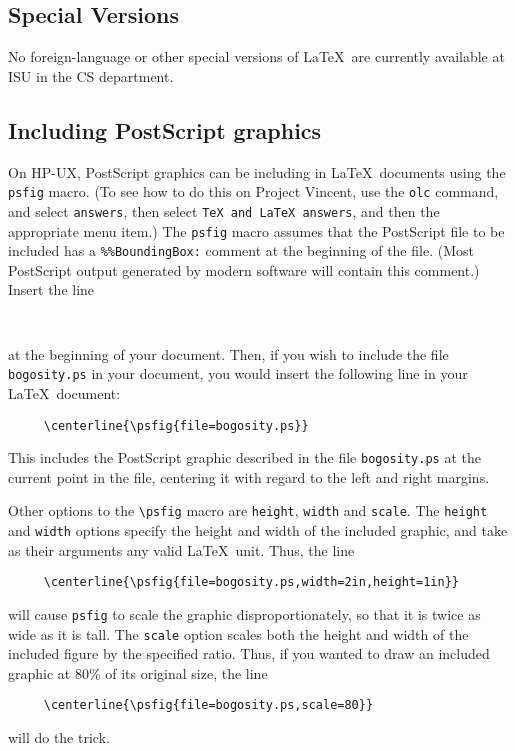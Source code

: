 \documentclass{article}
\begin{document}
\subsection{Special Versions}

No foreign-language or other special versions of \LaTeX\
are currently available at ISU in the CS department.


\subsection{Including PostScript graphics}

On HP-UX,
PostScript graphics can be including in \LaTeX\ documents using the 
{\tt psfig} macro.
(To see how to do this on Project Vincent, use the {\tt olc}
command, and select {\tt answers}, then select {\tt TeX and LaTeX answers},
and then the appropriate menu item.)
The {\tt psfig} macro assumes that the PostScript file to be included has a
\verb|%%BoundingBox:| comment at the beginning of the file.
(Most PostScript output generated by modern software will contain this 
comment.)
Insert the line
\begin{verbatim}
     
\end{verbatim}
at the beginning of your document.
Then, if you wish to include the file {\tt bogosity.ps}
in your document, you would
insert the following line in your \LaTeX\ document:
\begin{verbatim}
     \centerline{\psfig{file=bogosity.ps}}
\end{verbatim}
This includes the PostScript graphic described in the file
{\tt bogosity.ps} at the current point in the file, centering
it with regard to the left and right margins.

Other options to the \verb|\psfig| macro are {\tt height}, 
{\tt width} and {\tt scale}.
The {\tt height} and {\tt width} options specify the height
and width of the included graphic, and take as their arguments
any valid \LaTeX\ unit.
Thus, the line 
\begin{verbatim}
     \centerline{\psfig{file=bogosity.ps,width=2in,height=1in}}
\end{verbatim}
will cause {\tt psfig} to scale the graphic disproportionately,
so that it is twice as wide as it is tall.
The {\tt scale} option scales both the height and width of the 
included figure by the specified ratio.  
Thus, if you wanted to draw an included graphic at 80\% of 
its original size, the line
\begin{verbatim}
     \centerline{\psfig{file=bogosity.ps,scale=80}}
\end{verbatim}
will do the trick.
\end{document}
